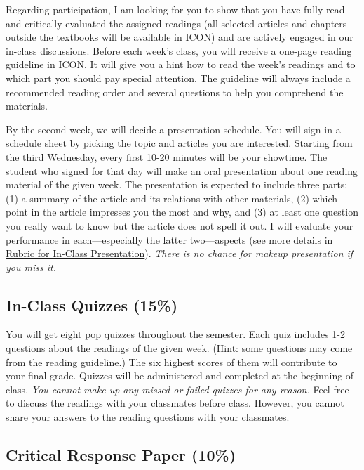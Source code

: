 \documentclass[11pt,]{article}
\theoremstyle{definition}
\theoremstyle{definition}
\theoremstyle{remark}
\begin{document}
Regarding participation, I am looking for you to show that you have
fully read and critically evaluated the assigned readings (all selected
articles and chapters outside the textbooks will be available in ICON)
and are actively engaged in our in-class discussions. Before each week's
class, you will receive a one-page reading guideline in ICON. It will
give you a hint how to read the week's readings and to which part you
should pay special attention. The guideline will always include a
recommended reading order and several questions to help you comprehend
the materials.

By the second week, we will decide a presentation schedule. You will
sign in a
\href{https://docs.google.com/spreadsheets/d/1s7WX9B5ePwlLhyOlqV_XBHU6lFmbHsyClbAOLV5Jaek/edit?usp=sharing}{schedule
sheet} by picking the topic and articles you are interested. Starting
from the third Wednesday, every first 10-20 minutes will be your
showtime. The student who signed for that day will make an oral
presentation about one reading material of the given week. The
presentation is expected to include three parts: (1) a summary of the
article and its relations with other materials, (2) which point in the
article impresses you the most and why, and (3) at least one question
you really want to know but the article does not spell it out. I will
evaluate your performance in each---especially the latter two---aspects
(see more details in \protect\hyperlink{id}{Rubric for In-Class
Presentation}). \emph{There is no chance for makeup presentation if you
miss it.}

\subsection{In-Class Quizzes (15\%)}\label{in-class-quizzes-15}

You will get eight pop quizzes throughout the semester. Each quiz
includes 1-2 questions about the readings of the given week. (Hint: some
questions may come from the reading guideline.) The six highest scores
of them will contribute to your final grade. Quizzes will be
administered and completed at the beginning of class. \emph{You cannot
make up any missed or failed quizzes for any reason.} Feel free to
discuss the readings with your classmates before class. However, you
cannot share your answers to the reading questions with your classmates.

\subsection{Critical Response Paper
(10\%)}\label{critical-response-paper-10}
\end{document}
